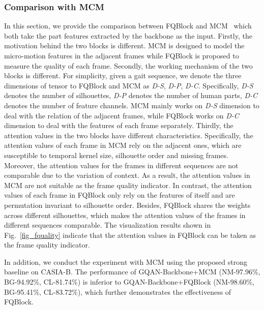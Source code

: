 \subsubsection{Comparison with MCM}
\label{sec_mcm_comparison}
In this section, we provide the comparison between FQBlock and MCM~\cite{fan2020gaitpart} which both take the part features extracted by the backbone as the input.
%
Firstly, the motivation behind the two blocks is different. MCM is designed to model the micro-motion features in the adjacent frames while FQBlock is proposed to measure the quality of each frame.
%
Secondly, the working mechanism of the two blocks is different. For simplicity, given a gait sequence, we denote the three dimensions of tensor to FQBlock and MCM as \emph{D-S}, \emph{D-P}, \emph{D-C}. Specifically, \emph{D-S} denotes the number of silhouettes, \emph{D-P} denotes the number of human parts, \emph{D-C} denotes the number of feature channels. MCM mainly works on \emph{D-S} dimension to deal with the relation of the adjacent frames, while FQBlock works on \emph{D-C} dimension to deal with the features of each frame separately.
%
Thirdly, the attention values in the two blocks have different characteristics. Specifically, the attention values of each frame in MCM rely on the adjacent ones, which are susceptible to temporal kernel size, silhouette order and missing frames. Moreover, the attention values for the frames in different sequences are not comparable due to the variation of context. As a result, the attention values in MCM are not suitable as the frame quality indicator. In contrast, the attention values of each frame in FQBlock only rely on the features of itself and are permutation invariant to silhouette order. Besides, FQBlock shares the weights across different silhouettes, which makes the attention values of the frames in different sequences comparable. The visualization results shown in Fig.~\ref{fig_fquality} indicate that the attention values in FQBlock can be taken as the frame quality indicator.

In addition, we conduct the experiment with MCM using the proposed strong baseline on CASIA-B. The performance of GQAN-Backbone+MCM (NM-97.96\%, BG-94.92\%, CL-81.74\%) is inferior to GQAN-Backbone+FQBlock (NM-98.60\%, BG-95.41\%, CL-83.72\%), which further demonstrates the effectiveness of FQBlock.

